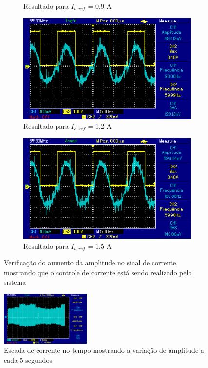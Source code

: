 \begin{figure}[!hbt]
\begin{subfigure}[b]{0.49\textwidth}
		\caption{Resultado para $I_{d,ref}$ = 0,9 A}
	\end{subfigure}
	\begin{subfigure}[b]{0.49\textwidth}
		\centering
		\includegraphics[width=\textwidth]{figuras/resultados_controle_corrente_1_2.png}
		\caption{Resultado para $I_{d,ref}$ = 1,2 A}
	\end{subfigure}
	\begin{subfigure}[b]{0.49\textwidth}
		\centering
		\includegraphics[width=\textwidth]{figuras/resultados_controle_corrente_1_5.png}
		\caption{Resultado para $I_{d,ref}$ = 1,5 A}
	\end{subfigure}
	\caption{Verificação do aumento da amplitude no sinal de corrente, mostrando que o controle de corrente está sendo realizado pelo sistema}
    \label{fig:res-controle-corrente}
\end{figure}

\begin{figure}[!hbt]
	\begin{center}
    \includegraphics[width=0.4\textwidth]{figuras/resultados_escada_corrente.png}
	\caption{Escada de corrente no tempo mostrando a variação de amplitude a cada 5 segundos}
    \label{fig:res-escada-corrente}
    \end{center}
\end{figure}
